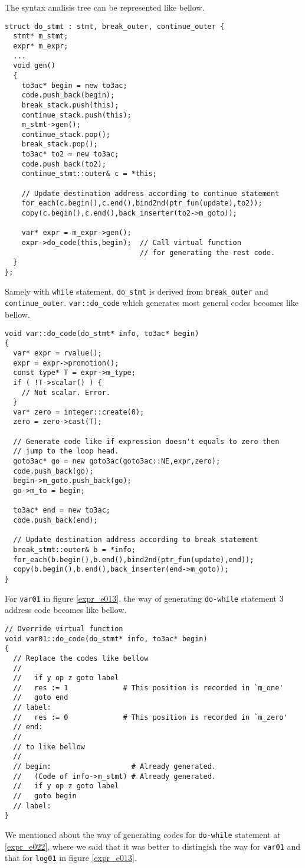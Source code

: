 The syntax analisis tree can be represented like bellow.
\begin{verbatim}
struct do_stmt : stmt, break_outer, continue_outer {
  stmt* m_stmt;
  expr* m_expr;
  ...
  void gen()
  {
    to3ac* begin = new to3ac;
    code.push_back(begin);
    break_stack.push(this);
    continue_stack.push(this);
    m_stmt->gen();
    continue_stack.pop();
    break_stack.pop();
    to3ac* to2 = new to3ac;
    code.push_back(to2);
    continue_stmt::outer& c = *this;

    // Update destination address according to continue statement
    for_each(c.begin(),c.end(),bind2nd(ptr_fun(update),to2));
    copy(c.begin(),c.end(),back_inserter(to2->m_goto));

    var* expr = m_expr->gen();
    expr->do_code(this,begin);  // Call virtual function
                                // for generating the rest code.
  }
};
\end{verbatim}
Samely with {\tt{while}} statement, {\tt{do\_stmt}} is
derived from {\tt{break\_outer}} and {\tt{continue\_outer}}.
{\tt{var::do\_code}} which generates most general codes
becomes like bellow.
\begin{verbatim}
void var::do_code(do_stmt* info, to3ac* begin)
{
  var* expr = rvalue();
  expr = expr->promotion();
  const type* T = expr->m_type;
  if ( !T->scalar() ) {
    // Not scalar. Error.
  }
  var* zero = integer::create(0);
  zero = zero->cast(T);

  // Generate code like if expression doesn't equals to zero then
  // jump to the loop head.
  goto3ac* go = new goto3ac(goto3ac::NE,expr,zero);
  code.push_back(go);
  begin->m_goto.push_back(go);
  go->m_to = begin;

  to3ac* end = new to3ac;
  code.push_back(end);

  // Update destination address according to break statement
  break_stmt::outer& b = *info;
  for_each(b.begin(),b.end(),bind2nd(ptr_fun(update),end));
  copy(b.begin(),b.end(),back_inserter(end->m_goto));
}
\end{verbatim}
For {\tt{var01}} in figure \ref{expr_e013},
the way of generating {\tt{do-while}} statement 3 address code
becomes like bellow.
\begin{verbatim}
// Override virtual function
void var01::do_code(do_stmt* info, to3ac* begin)
{
  // Replace the codes like bellow
  //
  //   if y op z goto label
  //   res := 1             # This position is recorded in `m_one'
  //   goto end
  // label:
  //   res := 0             # This position is recorded in `m_zero'
  // end:
  //
  // to like bellow
  //
  // begin:                   # Already generated.
  //   (Code of info->m_stmt) # Already generated.
  //   if y op z goto label
  //   goto begin
  // label:
}
\end{verbatim}
We mentioned about the way of generating codes for
{\tt{do-while}} statement at \ref{expr_e022}, where
we said that it was better to distingish 
the way for {\tt{var01}} and that for {\tt{log01}} in
figure \ref{expr_e013}.


